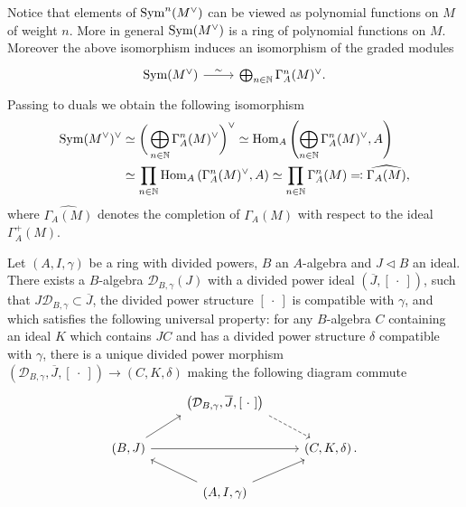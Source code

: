 \begin{rem}
	Notice that elements of \(\operatorname{Sym}^n(M^\vee)\) can be viewed as
	polynomial functions on \(M\) of weight \(n\).
	More in general \(\operatorname{Sym}(M^\vee)\) is a ring of
	polynomial functions on \(M\).
	Moreover the above isomorphism induces an isomorphism
	of the graded modules
	\begin{equation*}
	\begin{tikzcd}
		\sym(M^\vee)
		\arrow[r, "\sim", rightarrow] &
		\bigoplus_{ n \in \mathbb{N} } \Gamma^n_A(M)^\vee
	.\end{tikzcd}
	\end{equation*}
	Passing to duals we obtain the following isomorphism
	\begin{align*}
		\operatorname{Sym}(M^\vee)^\vee &\simeq
		\bigg( \bigoplus_{ n \in \mathbb{N} } \Gamma^n_A(M)^\vee \bigg)^\vee \simeq
		\operatorname{Hom}_A \left(\bigoplus_{ n \in \mathbb{N} } \Gamma_A^n(M)^\vee, A\right) \\
		&\simeq
		\prod_{ n \in \mathbb{N} } \operatorname{Hom}_A \left(\Gamma_A^n(M)^\vee, A\right) \simeq
		\prod_{ n \in \mathbb{N} } \Gamma_A^n(M) \eqqcolon
		\widehat{\Gamma_A(M)}
	,\end{align*}
	where \(\widehat{\Gamma_A(M)}\) denotes the completion of
	\(\Gamma_A(M)\) with respect to the ideal \(\Gamma_A^+(M)\).
\end{rem}


\begin{thm}\label{thm:PDEnvelope}
	Let $\left(A, I, \gamma\right)$ be a ring with divided powers, $B$ an $A$-algebra
	and $J \triangleleft B$ an ideal.
	There exists a $B$-algebra $\mathcal{D}_{B,\gamma}(J)$
	with a divided power ideal $\left(\overline{J}, [\ \cdot \ ]\right)$,
	such that $J \mathcal{D}_{B, \gamma} \subset \overline{J}$,
	the divided power structure $[\ \cdot \ ]$ 
	is compatible with $\gamma$, and which satisfies the
	following universal property:
	for any $B$-algebra $C$ containing an ideal
	$K$ which contains $JC$ and has a divided power structure
	$\delta$ compatible  with $\gamma$, there is a unique 
	divided power morphism 
	$\left(\mathcal{D}_{B,\gamma}, \overline{J}, [\ \cdot \ ]\right) \to 
	\left(C, K, \delta\right)$ making the following
	diagram commute
	\begin{equation*}
	\begin{tikzcd}
		&
		\left(\mathcal{D}_{B, \gamma}, \overline{J}, [\ \cdot \ ]\right)
		\arrow[rd, "", dashrightarrow,
		start anchor=south east] & \\
		\left(B, J\right) \arrow[ru, "", rightarrow,
		end anchor=south west] 
		\arrow[rr, "", rightarrow] & &
		\left(C, K, \delta\right). \\
		&
		\left(A, I, \gamma\right)
		\arrow[lu, "", rightarrow,
		start anchor=north west] 
		\arrow[ru, "", rightarrow,
		start anchor=north east] & 
	\end{tikzcd}
	\end{equation*}
\end{thm}


